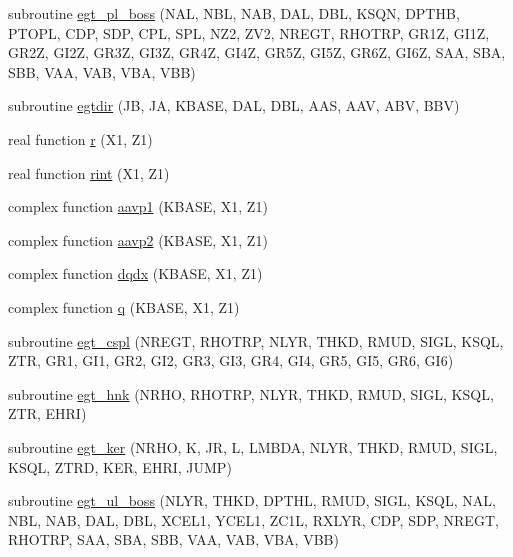 \begin{DoxyCompactItemize}
subroutine \hyperlink{Leroi_8f90_a7acbe12b71ec5be34d994fc6743480c8}{egt\+\_\+pl\+\_\+boss} (N\+AL, N\+BL, N\+AB, D\+AL, D\+BL, K\+S\+QN, D\+P\+T\+HB, P\+T\+O\+PL, C\+DP, S\+DP, C\+PL, S\+PL, N\+Z2, Z\+V2, N\+R\+E\+GT, R\+H\+O\+T\+RP, G\+R1Z, G\+I1Z, G\+R2Z, G\+I2Z, G\+R3Z, G\+I3Z, G\+R4Z, G\+I4Z, G\+R5Z, G\+I5Z, G\+R6Z, G\+I6Z, S\+AA, S\+BA, S\+BB, V\+AA, V\+AB, V\+BA, V\+BB)
\item 
subroutine \hyperlink{Leroi_8f90_a24151574c4bb3d7844db88f91d23b589}{egtdir} (JB, JA, K\+B\+A\+SE, D\+AL, D\+BL, A\+AS, A\+AV, A\+BV, B\+BV)
\item 
real function \hyperlink{Leroi_8f90_ab86561ed12c5864e44152801ef93c7c8}{r} (X1, Z1)
\item 
real function \hyperlink{Leroi_8f90_a175215729f915283d0b8fb5dec72eb0a}{rint} (X1, Z1)
\item 
complex function \hyperlink{Leroi_8f90_a2d69cada9a1fff81caa02d919be5ce7c}{aavp1} (K\+B\+A\+SE, X1, Z1)
\item 
complex function \hyperlink{Leroi_8f90_afeabf8ee47c9628f00ed2dfa98f56e40}{aavp2} (K\+B\+A\+SE, X1, Z1)
\item 
complex function \hyperlink{Leroi_8f90_a0dd58336077baa8c233cc4d08cc10939}{dqdx} (K\+B\+A\+SE, X1, Z1)
\item 
complex function \hyperlink{Leroi_8f90_a3849611a53bff318a7443ebea8b8b480}{q} (K\+B\+A\+SE, X1, Z1)
\item 
subroutine \hyperlink{Leroi_8f90_a39b25039701be699f724d2a872d3d3f3}{egt\+\_\+cspl} (N\+R\+E\+GT, R\+H\+O\+T\+RP, N\+L\+YR, T\+H\+KD, R\+M\+UD, S\+I\+GL, K\+S\+QL, Z\+TR, G\+R1, G\+I1, G\+R2, G\+I2, G\+R3, G\+I3, G\+R4, G\+I4, G\+R5, G\+I5, G\+R6, G\+I6)
\item 
subroutine \hyperlink{Leroi_8f90_ae50e88569c7037d3d431d0b0dd30c795}{egt\+\_\+hnk} (N\+R\+HO, R\+H\+O\+T\+RP, N\+L\+YR, T\+H\+KD, R\+M\+UD, S\+I\+GL, K\+S\+QL, Z\+TR, E\+H\+RI)
\item 
subroutine \hyperlink{Leroi_8f90_ad8346887f578fa81508d64ff7308bd70}{egt\+\_\+ker} (N\+R\+HO, K, JR, L, L\+M\+B\+DA, N\+L\+YR, T\+H\+KD, R\+M\+UD, S\+I\+GL, K\+S\+QL, Z\+T\+RD, K\+ER, E\+H\+RI, J\+U\+MP)
\item 
subroutine \hyperlink{Leroi_8f90_a9074cfabdfb82294ca3b8541c14a9099}{egt\+\_\+ul\+\_\+boss} (N\+L\+YR, T\+H\+KD, D\+P\+T\+HL, R\+M\+UD, S\+I\+GL, K\+S\+QL, N\+AL, N\+BL, N\+AB, D\+AL, D\+BL, X\+C\+E\+L1, Y\+C\+E\+L1, Z\+C1L, R\+X\+L\+YR, C\+DP, S\+DP, N\+R\+E\+GT, R\+H\+O\+T\+RP, S\+AA, S\+BA, S\+BB, V\+AA, V\+AB, V\+BA, V\+BB)
\item 

\end{DoxyCompactItemize}
